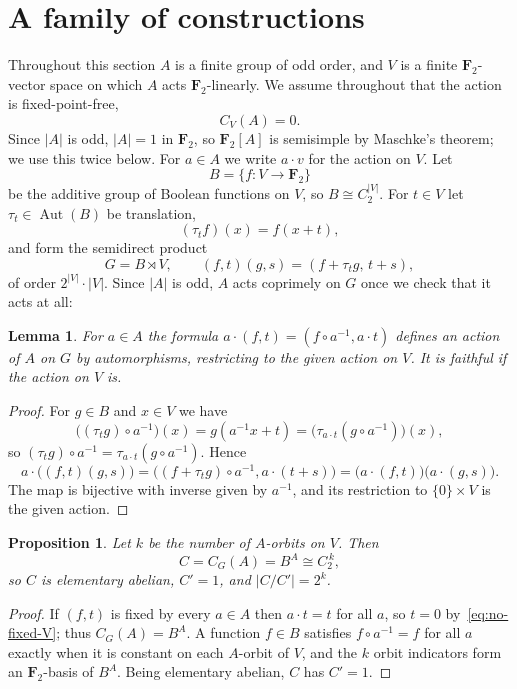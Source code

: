 \documentclass[11pt,a4paper,reqno]{amsart}
\newtheorem{proposition}[theorem]{Proposition}
\newtheorem{lemma}[theorem]{Lemma}
\theoremstyle{definition}
\theoremstyle{remark}
\newcommand{\F}{\mathbf F}
\begin{document}
\section{A family of constructions}\label{sec:family}

Throughout this section $A$ is a finite group of odd order, and $V$ is a
finite $\F_2$-vector space on which $A$ acts $\F_2$-linearly.  We assume
throughout that the action is fixed-point-free,
\begin{equation}\label{eq:no-fixed-V}
 C_V(A)=0 .
\end{equation}
Since $|A|$ is odd, $|A|=1$ in $\F_2$, so $\F_2[A]$ is semisimple by
Maschke's theorem; we use this twice below.  For $a\in A$ we write
$a\cdot v$ for the action on $V$.
Let
\[
 B=\{f:V\to\F_2\}
\]
be the additive group of Boolean functions on $V$, so
$B\cong C_2^{|V|}$.  For $t\in V$ let $\tau_t\in\operatorname{Aut}(B)$
be translation,
\[
 (\tau_tf)(x)=f(x+t),
\]
and form the semidirect product
\[
 G=B\rtimes V,
 \qquad
 (f,t)(g,s)=(f+\tau_tg,\,t+s),
\]
of order $2^{|V|}\cdot|V|$.  Since $|A|$ is odd, $A$ acts coprimely
on $G$ once we check that it acts at all:

\begin{lemma}\label{lem:action}
For $a\in A$ the formula $a\cdot(f,t)=(f\circ a^{-1},a\cdot t)$ defines
an action of $A$ on $G$ by automorphisms, restricting to the given
action on $V$.  It is faithful if the action on $V$ is.
\end{lemma}

\begin{proof}
For $g\in B$ and $x\in V$ we have
\[
 \bigl((\tau_tg)\circ a^{-1}\bigr)(x)=g(a^{-1}x+t)
 =\bigl(\tau_{a\cdot t}(g\circ a^{-1})\bigr)(x),
\]
so $(\tau_tg)\circ a^{-1}=\tau_{a\cdot t}(g\circ a^{-1})$.  Hence
\[
 a\cdot\bigl((f,t)(g,s)\bigr)
 =\bigl((f+\tau_tg)\circ a^{-1},a\cdot(t+s)\bigr)
 =\bigl(a\cdot(f,t)\bigr)\bigl(a\cdot(g,s)\bigr).
\]
The map is bijective with inverse given by $a^{-1}$, and its
restriction to $\{0\}\times V$ is the given action.
\end{proof}

\begin{proposition}\label{prop:fixed-subgroup}
Let $k$ be the number of $A$-orbits on $V$.  Then
\[
 C=C_G(A)=B^A\cong C_2^{\,k},
\]
so $C$ is elementary abelian, $C'=1$, and $|C/C'|=2^k$.
\end{proposition}

\begin{proof}
If $(f,t)$ is fixed by every $a\in A$ then $a\cdot t=t$ for all $a$, so
$t=0$ by~\eqref{eq:no-fixed-V}; thus $C_G(A)=B^A$.  A function $f\in B$
satisfies $f\circ a^{-1}=f$ for all $a$ exactly when it is constant on each
$A$-orbit of $V$, and the $k$ orbit indicators form an $\F_2$-basis of
$B^A$.  Being elementary abelian, $C$ has $C'=1$.
\end{proof}
\end{document}
